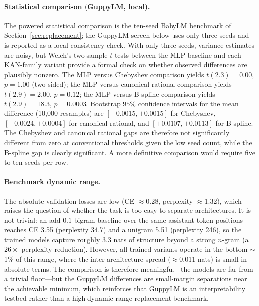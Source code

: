 \documentclass{article}
\begin{document}
\paragraph{Statistical comparison (GuppyLM, local).}
The powered statistical comparison is the ten-seed BabyLM benchmark of Section~\ref{sec:replacement}; the GuppyLM screen below uses only three seeds and is reported as a local consistency check. With only three seeds, variance estimates are noisy, but Welch's two-sample \(t\)-tests between the MLP baseline and each KAN-family variant provide a formal check on whether observed differences are plausibly nonzero. The MLP versus Chebyshev comparison yields \(t(2.3)=0.00\), \(p=1.00\) (two-sided); the MLP versus canonical rational comparison yields \(t(2.9)=2.00\), \(p=0.12\); the MLP versus B-spline comparison yields \(t(2.9)=18.3\), \(p=0.0003\). Bootstrap 95\% confidence intervals for the mean difference (10,000 resamples) are \([-0.0015,+0.0015]\) for Chebyshev, \([-0.0024,+0.0004]\) for canonical rational, and \([+0.0107,+0.0113]\) for B-spline. The Chebyshev and canonical rational gaps are therefore not significantly different from zero at conventional thresholds given the low seed count, while the B-spline gap is clearly significant. A more definitive comparison would require five to ten seeds per row.

\paragraph{Benchmark dynamic range.}
The absolute validation losses are low (CE \(\approx\)0.28, perplexity \(\approx\)1.32), which raises the question of whether the task is too easy to separate architectures. It is not trivial: an add-\(0.1\) bigram baseline over the same assistant-token positions reaches CE 3.55 (perplexity 34.7) and a unigram 5.51 (perplexity 246), so the trained models capture roughly 3.3 nats of structure beyond a strong \(n\)-gram (a \(26\times\) perplexity reduction). However, all trained variants operate in the bottom \(\sim\)1\% of this range, where the inter-architecture spread (\(\approx\)0.011 nats) is small in absolute terms. The comparison is therefore meaningful---the models are far from a trivial floor---but the GuppyLM differences are small-margin separations near the achievable minimum, which reinforces that GuppyLM is an interpretability testbed rather than a high-dynamic-range replacement benchmark.
\end{document}
